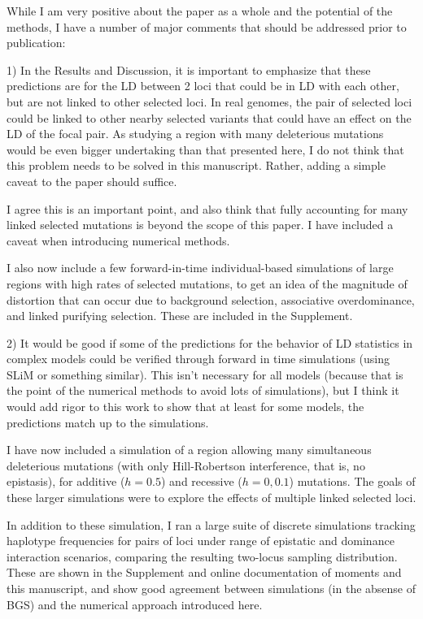 \documentclass{article}
\newenvironment{response}%
  {\list{}{\leftmargin=0.5in\rightmargin=0.5in\color{blue}}\item[]}%
  {\endlist}
\begin{document}
While I am very positive about the paper as a whole and the potential of the
methods, I have a number of major comments that should be addressed prior to
publication:

1) In the Results and Discussion, it is important to emphasize that these
predictions are for the LD between 2 loci that could be in LD with each other,
but are not linked to other selected loci. In real genomes, the pair of
selected loci could be linked to other nearby selected variants that could have
an effect on the LD of the focal pair. As studying a region with many
deleterious mutations would be even bigger undertaking than that presented
here, I do not think that this problem needs to be solved in this manuscript.
Rather, adding a simple caveat to the paper should suffice.

\begin{response}
    I agree this is an important point, and also think that fully accounting
    for many linked selected mutations is beyond the scope of this paper. I have
    included a caveat when introducing numerical methods.

    I also now include a few forward-in-time individual-based simulations
    of large regions with high rates of selected mutations, to get an idea of the
    magnitude of distortion that can occur due to background selection, associative
    overdominance, and linked purifying selection. These are included in the Supplement.
\end{response}

2) It would be good if some of the predictions for the behavior of LD
statistics in complex models could be verified through forward in time
simulations (using SLiM or something similar). This isn't necessary for all
models (because that is the point of the numerical methods to avoid lots of
simulations), but I think it would add rigor to this work to show that at least
for some models, the predictions match up to the simulations.

\begin{response}
    I have now included a simulation of a region allowing many simultaneous
    deleterious mutations (with only Hill-Robertson interference, that is,
    no epistasis), for additive ($h=0.5$) and recessive ($h=0, 0.1$) mutations.
    The goals of these larger simulations were to explore the effects of multiple
    linked selected loci.

    In addition to these simulation, I ran a large suite of discrete simulations
    tracking haplotype frequencies for pairs of loci under range of epistatic
    and dominance interaction scenarios, comparing the resulting two-locus
    sampling distribution. These are shown in the Supplement and online
    documentation of moments and this manuscript, and show good agreement between
    simulations (in the absense of BGS) and the numerical approach introduced here.
\end{response}
\end{document}
